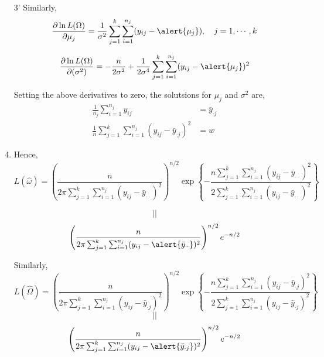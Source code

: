 \begin{frame}[fragile]

	\begin{enumerate}
		\item[3'] Similarly,
			\[
				\frac{\partial\ln L(\Omega)}{\partial \mu_j} = \frac{1}{\sigma^2}\sum_{j=1}^k\sum_{i=1}^{n_j}(y_{ij}-\alert{\mu_j}),\quad j=1,\cdots,k
			\]
		\item[]
			\[
				\frac{\partial\ln L(\Omega)}{\partial (\sigma^2)} = -\frac{n}{2\sigma^2} + \frac{1}{2\sigma^4}\sum_{j=1}^k\sum_{i=1}^{n_j}(y_{ij}-\alert{\mu_j})^2
			\]
			\vfill
		\item[] Setting the above derivatives to zero, the solutsions for $\mu_j$ and $\sigma^2$ are,
			\vfill
			\begin{align*}
				\frac{1}{n_j} \sum_{i=1}^{n_j} y_{ij} &= \bar{y}_{\cdot j}\\
				\frac 1n \sum_{j=1}^k\sum_{i=1}^{n_j} (y_{ij}-\bar{y}_{\cdot j})^2 &=w
			\end{align*}
	\end{enumerate}
\end{frame}
\begin{frame}[fragile]

	\begin{enumerate}
		\setcounter{enumi}{3}
		\item Hence,
			\[
				L(\hat\omega)
				= \left(  \frac{n}{2\pi\sum_{j=1}^k\sum_{i=1}^{n_j}(y_{ij}-\bar{y}_{\cdot\cdot})^2}\right )^{n/2}
				\exp\left\{
					-\frac{n\sum_{j=1}^k\sum_{i=1}^{n_j}(y_{ij}-\bar{y}_{\cdot\cdot})^2}{2\sum_{j=1}^k\sum_{i=1}^{n_j}(y_{ij}-\bar{y}_{\cdot\cdot})^2}
				\right\}
			\]
		\item[]
			\[ ||\]
			\[
				\left(  \frac{n}{2\pi\sum_{j=1}^k\sum_{i=1}^{n_j}(y_{ij}-\alert{\bar{y}_{\cdot\cdot}})^2}\right )^{n/2} e^{-n/2}
			\]
			\vfill
		\item[] Similarly,
			\[
				L(\hat\Omega) =
				\left(  \frac{n}{2\pi\sum_{j=1}^k\sum_{i=1}^{n_j}(y_{ij}-\bar{y}_{\cdot j})^2}\right )^{n/2}
				\exp\left\{
					-\frac{n\sum_{j=1}^k\sum_{i=1}^{n_j}(y_{ij}-\bar{y}_{\cdot j})^2}{2\sum_{j=1}^k\sum_{i=1}^{n_j}(y_{ij}-\bar{y}_{\cdot j})^2}
				\right\}
			\]
			\[||\]
			\[
				\left(  \frac{n}{2\pi\sum_{j=1}^k\sum_{i=1}^{n_j}(y_{ij}-\alert{\bar{y}_{\cdot j}})^2}\right )^{n/2} e^{-n/2}
			\]
	\end{enumerate}
\end{frame}
